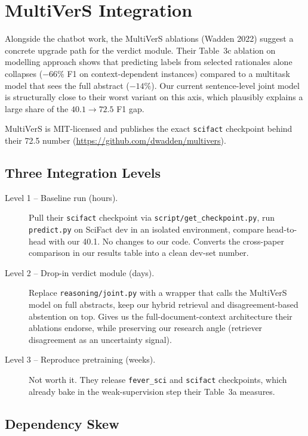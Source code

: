 \documentclass[11pt,a4paper]{article}
\begin{document}
\section{MultiVerS Integration}

Alongside the chatbot work, the MultiVerS ablations
(Wadden 2022) suggest a concrete upgrade path for the verdict module.
Their Table~3c ablation on modelling approach shows that predicting
labels from selected rationales alone collapses ($-66\%$ F1 on
context-dependent instances) compared to a multitask model that sees
the full abstract ($-14\%$). Our current sentence-level joint model is
structurally close to their worst variant on this axis, which plausibly
explains a large share of the $40.1 \to 72.5$ F1 gap.

MultiVerS is MIT-licensed and publishes the exact \texttt{scifact}
checkpoint behind their 72.5 number
(\url{https://github.com/dwadden/multivers}).

\subsection{Three Integration Levels}

\begin{description}
  \item[Level 1 -- Baseline run (hours).]
    Pull their \texttt{scifact} checkpoint via
    \texttt{script/get\_checkpoint.py}, run \texttt{predict.py} on
    SciFact dev in an isolated environment, compare head-to-head with
    our 40.1. No changes to our code. Converts the cross-paper comparison
    in our results table into a clean dev-set number.
  \item[Level 2 -- Drop-in verdict module (days).]
    Replace \texttt{reasoning/joint.py} with a wrapper that calls the
    MultiVerS model on full abstracts, keep our hybrid retrieval and
    disagreement-based abstention on top. Gives us the
    full-document-context architecture their ablations endorse, while
    preserving our research angle (retriever disagreement as an
    uncertainty signal).
  \item[Level 3 -- Reproduce pretraining (weeks).]
    Not worth it. They release \texttt{fever\_sci} and \texttt{scifact}
    checkpoints, which already bake in the weak-supervision step their
    Table~3a measures.
\end{description}

\subsection{Dependency Skew}
\end{document}
